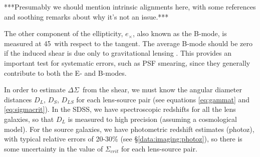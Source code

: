 \documentclass{emulateapj}
\newcommand{\deltasig}{$\Delta \Sigma$}
\begin{document}
***Presumably we should mention intrinsic alignments here, with 
some references and soothing remarks about why it's not an issue.***

The other component of the ellipticity, $e_\times$, also known as the B-mode, 
is measured at 
45\degr\ with respect to the tangent. The average B-mode should be zero if the 
induced shear is due only to gravitational 
lensing \citep{Kaiser95,Luppino97}.  This provides an important test for 
systematic errors, such as PSF smearing, since they generally  
contribute to both the E- and B-modes.


In order to estimate \deltasig\ from the shear, we must know the angular 
diameter distances $D_L$, $D_S$, $D_{LS}$ for 
each lens-source pair (see equations \ref{eq:gammat} and \ref{eq:sigmacrit}). 
In the SDSS, we have spectroscopic redshifts for all the lens galaxies, so 
that $D_L$ is measured to high precision (assuming a cosmological model). 
For the source galaxies, we have photometric redshift estimates (photoz), 
with typical relative errors of  
20-30\% (see \S \ref{data:imaging:photoz}), so there is some uncertainty in 
the value of $\Sigma_{crit}$ for each lens-source pair. 
\end{document}
